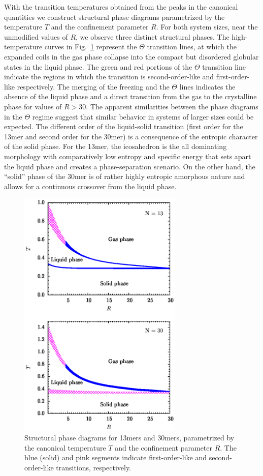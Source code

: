 \documentclass[12pt]{report}
\begin{document}
With the transition temperatures obtained from the peaks in the canonical quantities we construct structural phase diagrams parametrized by the temperature $T$ and the confinement parameter $R$. For both system sizes, near the unmodified values of $R$, we observe three distinct structural phases. The high-temperature curves in Fig.~\ref{fig:ElasPolyPhaseDiagrams} represent the $\Theta$ transition lines, at which the expanded coils in the gas phase collapse into the compact but disordered globular states in the liquid phase. The green and red portions of the $\Theta$ transition line indicate the regions in which the transition is second-order-like and first-order-like respectively. The merging of the freezing and the $\Theta$ lines indicates the absence of the liquid phase and a direct transition from the gas to the crystalline phase for values of $R > 30$. The apparent similarities between the phase diagrams in the $\Theta$ regime suggest that similar behavior in systems of larger sizes could be expected. The different order of the liquid-solid transition (first order for the 13mer and second order for the 30mer) is a consequence of the entropic character of the solid phase. For the 13mer, the icosahedron is the all dominating morphology with comparatively low entropy and specific energy that sets apart the liquid phase and creates a phase-separation scenario. On the other hand, the ``solid'' phase of the 30mer is of rather highly entropic amorphous nature and allows for a continuous crossover from the liquid phase. 

%
\begin{figure}
\center
\includegraphics[width = 0.7\textwidth]{chapter5Figs/pd1330.eps}
\caption{\label{fig:ElasPolyPhaseDiagrams}%
Structural phase diagrams for 13mers and 30mers, parametrized by the canonical temperature $T$ and the confinement parameter $R$. The blue (solid) and pink segments indicate first-order-like and second-order-like transitions, respectively.}
\end{figure}
%
\end{document}
